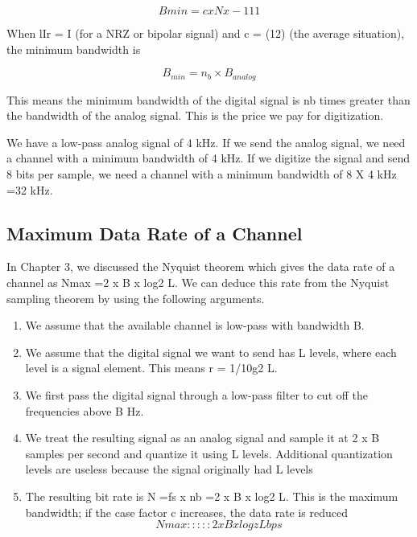 \begin{equation}
  Bmin =c x N x - 111
\end{equation}

\noindent When lIr = I (for a NRZ or bipolar signal) and c = (12) (the average situation), the minimum bandwidth is

\begin{equation}
  B_{min} = n_b \times B_{analog}
\end{equation}

\noindent This means the minimum bandwidth of the digital signal is nb times greater than the bandwidth of the analog signal. This is the price we pay for digitization.

\vspace{12pt}

\begin{example}
  We have a low-pass analog signal of 4 kHz. If we send the analog signal, we need a channel with a minimum bandwidth of 4 kHz. If we digitize the signal and send 8 bits per sample, we need a channel with a minimum bandwidth of 8 X 4 kHz =32 kHz.
\end{example}

\subsection*{Maximum Data Rate of a Channel}
In Chapter 3, we discussed the Nyquist theorem which gives the data rate of a channel as Nmax =2 x B x log2 L. We can deduce this rate from the Nyquist sampling theorem by using the following arguments.
\begin{enumerate}
  \item We assume that the available channel is low-pass with bandwidth B.
  \item We assume that the digital signal we want to send has L levels, where each level is a signal element. This means r = 1/10g2 L.
  \item We first pass the digital signal through a low-pass filter to cut off the frequencies above B Hz.
  \item We treat the resulting signal as an analog signal and sample it at 2 x B samples per second and quantize it using L levels. Additional quantization levels are useless because the signal originally had L levels
  \item The resulting bit rate is N =fs x nb =2 x B x log2 L. This is the maximum bandwidth; if the case factor c increases, the data rate is reduced
  \begin{equation}
    Nmax ::::: 2 x B x logzL bps
  \end{equation}
\end{enumerate}

